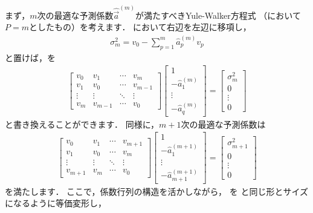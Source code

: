 まず，$m$次の最適な予測係数$\hat{\Vec{a}}^{(m)}$が満たすべきYule-Walker方程式
（において$P = m$としたもの）を考えます．
において右辺を左辺に移項し，
\begin{align}
\sigma_m^2 = v_0 - \sum_{p=1}^{m} \hat{a}_p^{(m)} v_p 
\label{eq:sigma_P}
\end{align}
と置けば，を
\begin{align}
\begin{bmatrix}
v_{0}&v_{1}&\cdots&v_{m}\\
v_1&v_0&\cdots&v_{m-1}\\
\vdots&\vdots&\ddots&\vdots\\
v_{m}&v_{m-1}&\cdots&v_{0}
\end{bmatrix}
\begin{bmatrix}
1\\
-\hat{a}_1^{(m)}\\
\vdots\\
-\hat{a}_q^{(m)}
\end{bmatrix}
=
\begin{bmatrix}
\sigma_m^2\\
0\\
\vdots\\
0
\end{bmatrix}
\label{eq:LevinsonDurbin_1}
\end{align}
と書き換えることができます．
同様に，$m+1$次の最適な予測係数は
\begin{align}
\begin{bmatrix}
v_{0}&v_{1}&\cdots&v_{m+1}\\
v_1&v_0&\cdots&v_{m}\\
\vdots&\vdots&\ddots&\vdots\\
v_{m+1}&v_{m}&\cdots&v_{0}
\end{bmatrix}
\begin{bmatrix}
1\\
-\hat{a}_1^{(m+1)}\\
\vdots\\
-\hat{a}_{m+1}^{(m+1)}
\end{bmatrix}
=
\begin{bmatrix}
\sigma_{m+1}^2\\
0\\
\vdots\\
0
\end{bmatrix}
\label{eq:LevinsonDurbin_2}
\end{align}
を満たします．
ここで，係数行列の構造を活かしながら，
を
と同じ形とサイズになるように等価変形し，
